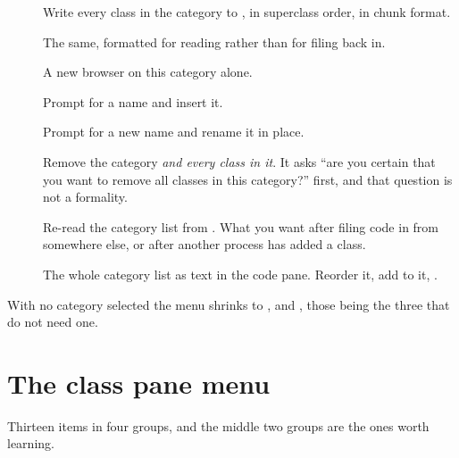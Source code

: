 \begin{description}
\item[] Write every class in the category to
  , in superclass order, in chunk format.
\item[] The same, formatted for reading rather than for filing
  back in.
\item[] A new browser on this category alone.
\item[] Prompt for a name and insert it.
\item[] Prompt for a new name and rename it in place.
\item[] Remove the category \emph{and every class in it}. It asks
  ``are you certain that you want to remove all classes in this category?''
  first, and that question is not a formality.
\item[] Re-read the category list from .
  What you want after filing code in from somewhere else, or after another
  process has added a class.
\item[] The whole category list as text in the code pane.
  Reorder it, add to it, .
\end{description}

With no category selected the menu shrinks to ,
 and , those being the three that do not need one.

\section{The class pane menu}

Thirteen items in four groups, and the middle two groups are the ones worth
learning.

